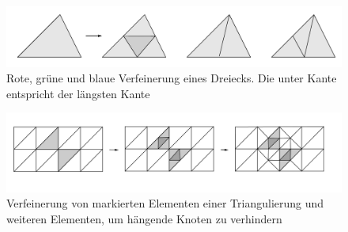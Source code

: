 \begin{figure}[!htbp]
	\begin{center}
		\includegraphics[width=16cm]{pics/redref.png}
	\end{center}
	\caption{\label{dreieck}Rote, grüne und blaue Verfeinerung eines Dreiecks. Die unter Kante entspricht der längsten Kante}
\end{figure}

\begin{figure}[!htbp]
	\begin{center}
		\includegraphics[width=16cm]{pics/refin.png}
	\end{center}
	\caption{Verfeinerung von markierten Elementen einer Triangulierung und weiteren Elementen, um hängende Knoten zu verhindern}
\end{figure}

